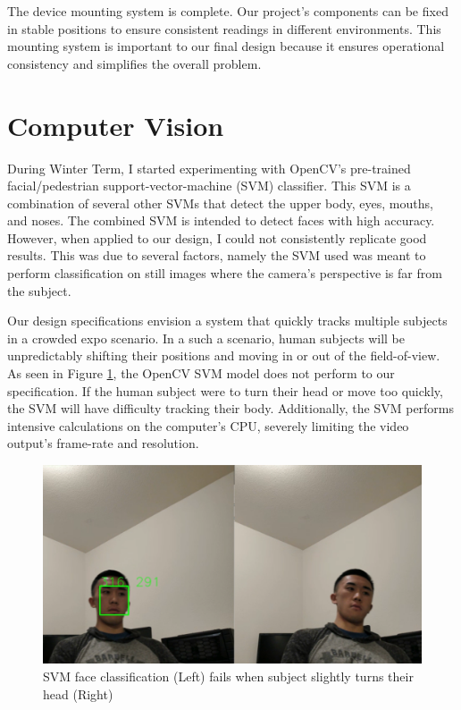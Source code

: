 \documentclass[onecolumn, draftclsnofoot,10pt, compsoc]{IEEEtran}
\makeatletter
\newcommand\captionof[1]{\def\@captype{#1}\caption}
\makeatother
\begin{document}
\begin{singlespace}
		The device mounting system is complete. 
		Our project's components can be fixed in stable positions to ensure consistent readings in different environments.
		This mounting system is important to our final design because it ensures operational consistency and simplifies the overall problem. 


		\section{Computer Vision}
			During Winter Term, I started experimenting with OpenCV's pre-trained facial/pedestrian support-vector-machine (SVM) classifier.
			This SVM is a combination of several other SVMs that detect the upper body, eyes, mouths, and noses.
			The combined SVM is intended to detect faces with high accuracy.
			However, when applied to our design, I could not consistently replicate good results.
			This was due to several factors, namely the SVM used was meant to perform classification on still images where the camera's perspective is far from the subject.
			

			Our design specifications envision a system that quickly tracks multiple subjects in a crowded expo scenario.
			In a such a scenario, human subjects will be unpredictably shifting their positions and moving in or out of the field-of-view.
			As seen in Figure \ref{svm}, the OpenCV SVM model does not perform to our specification.
			If the human subject were to turn their head or move too quickly, the SVM will have difficulty tracking their body.
			Additionally, the SVM performs intensive calculations on the computer's CPU, severely limiting the video output's frame-rate and resolution.
			
			\begin{figure}[H]
			\includegraphics[scale=0.60]{svm.PNG}
			\captionof{figure}{SVM face classification (Left) fails when subject slightly turns their head (Right)}
			\label{svm}
			\end{figure}



\end{singlespace}
\end{document}
